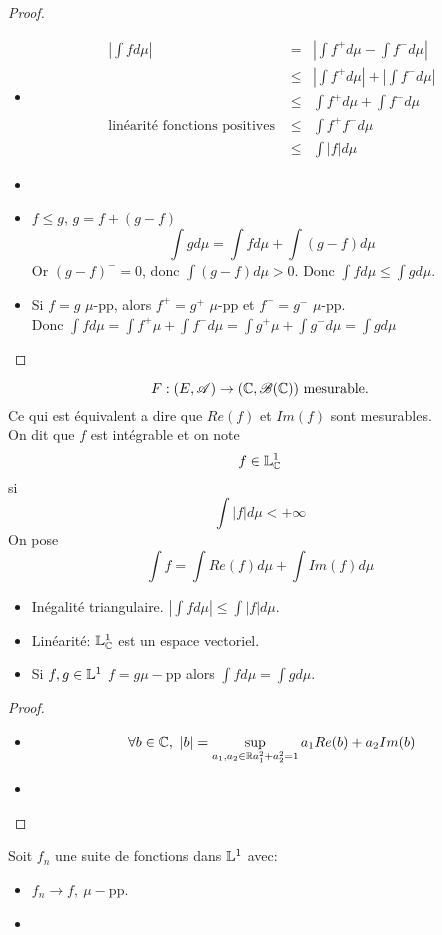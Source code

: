\begin{proof}
	\begin{itemize}
		\item  \begin{eqnarray*}
			      |\int f d\mu| &=& \left|\int f^+ d\mu - \int f^- d\mu \right| \\
			      &\leq& \left|\int f^+ d\mu \right| + \left|\int f^- d\mu \right| \\
			      &\leq& \int f^+ d\mu + \int f^- d\mu  \\
			      \text{linéarité fonctions positives } &\leq& \int f^+ f^- d\mu  \\
			      &\leq& \int |f| d\mu
		      \end{eqnarray*}
		\item %
		\item $f \leq g$, $g = f + (g-f)$
		      $$\int g d\mu = \int f d\mu + \int (g-f) d \mu$$
		      Or $(g-f)^- = 0$, donc $\int (g-f) d\mu > 0$.
		      Donc $\int f d\mu \leq \int g d\mu$.
		\item Si $f = g$ $\mu$-pp, alors $f^+ = g^+$ $\mu$-pp et $f^- = g^-$ $\mu$-pp.\\
		      Donc $\int f d\mu = \int f^+ \mu + \int f^-  d\mu = \int g^+ \mu + \int g^-  d\mu = \int g d\mu$
	\end{itemize}
\end{proof}

\begin{definition}
	$$ F: (E, \mathscr{A}) \to (\mathbb{C}, \mathscr{B}(\mathbb{C})) \text{ mesurable.}$$
	Ce qui est équivalent a dire que $Re(f)$ et $Im(f)$ sont mesurables.\\
	On dit que $f$ est intégrable et on note
	$$ f\in \mathbb{L}^1_{\mathbb{C}}$$
	si $$\int |f| d\mu < +\infty$$
	On pose
	$$ \int f = \int Re(f) d\mu + \int Im(f) d\mu $$
\end{definition}


\begin{prop}
	\begin{itemize}
		\item Inégalité triangulaire. $\left| \int f d\mu \right| \leq \int |f| d \mu$.
		\item Linéarité: $\mathbb{L}^1_{\mathbb{C}}$ est un espace vectoriel.
		\item Si $f,g \in \mathbb{L}^1$ $f = g \mu-$pp alors $\int f d\mu = \int g d\mu$.
	\end{itemize}
\end{prop}


\begin{proof}
	\begin{itemize}
		\item $$\forall b \in \mathbb{C}, \ |b| = \sup_{a_1, a_2 \in \mathbb{R} \\ a_1^2 + a_2^2 = 1 } a_1 Re(b) + a_2 Im(b)$$
		\item
	\end{itemize}
\end{proof}



\begin{theorem}
	Soit $f_n$ une suite de fonctions dans $\mathbb{L}^1$ avec:
	\begin{itemize}
		\item $f_n \to f, \ \mu-$pp.
		\item %
	\end{itemize}
\end{theorem}






